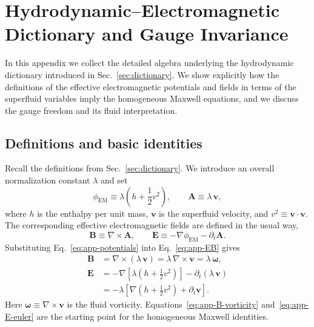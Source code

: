 \documentclass[11pt]{article}
\begin{document}
\section{Hydrodynamic--Electromagnetic Dictionary and Gauge Invariance}
\label{app:dictionary}

In this appendix we collect the detailed algebra underlying the hydrodynamic dictionary introduced in Sec.~\ref{sec:dictionary}.  We show explicitly how the definitions of the effective electromagnetic potentials and fields in terms of the superfluid variables imply the homogeneous Maxwell equations, and we discuss the gauge freedom and its fluid interpretation.

\subsection{Definitions and basic identities}

Recall the definitions from Sec.~\ref{sec:dictionary}.  We introduce an overall normalization constant $\lambda$ and set
\begin{equation}
\phi_{\mathrm{EM}} \equiv \lambda \left(h + \frac{1}{2} v^2\right),
\qquad
\mathbf{A} \equiv \lambda\,\mathbf{v},
\label{eq:app-potentials}
\end{equation}
where $h$ is the enthalpy per unit mass, $\mathbf{v}$ is the superfluid velocity, and $v^2 \equiv \mathbf{v}\cdot\mathbf{v}$.  The corresponding effective electromagnetic fields are defined in the usual way,
\begin{equation}
\mathbf{B} \equiv \nabla \times \mathbf{A},
\qquad
\mathbf{E} \equiv -\nabla \phi_{\mathrm{EM}} - \partial_t \mathbf{A}.
\label{eq:app-EB}
\end{equation}
Substituting Eq.~\eqref{eq:app-potentials} into Eq.~\eqref{eq:app-EB} gives
\begin{align}
\mathbf{B}
&= \nabla \times (\lambda\,\mathbf{v})
 = \lambda\,\nabla \times \mathbf{v}
 = \lambda\,\boldsymbol{\omega},
\label{eq:app-B-vorticity}\\[4pt]
\mathbf{E}
&= -\nabla\!\left[\lambda\left(h + \frac{1}{2}v^2\right)\right]
   - \partial_t (\lambda\,\mathbf{v})
\nonumber\\
&= -\lambda\left[\nabla\left(h + \frac{1}{2}v^2\right)
               + \partial_t \mathbf{v}\right].
\label{eq:app-E-euler}
\end{align}
Here $\boldsymbol{\omega} \equiv \nabla\times\mathbf{v}$ is the fluid vorticity.  Equations~\eqref{eq:app-B-vorticity} and~\eqref{eq:app-E-euler} are the starting point for the homogeneous Maxwell identities.
\end{document}
